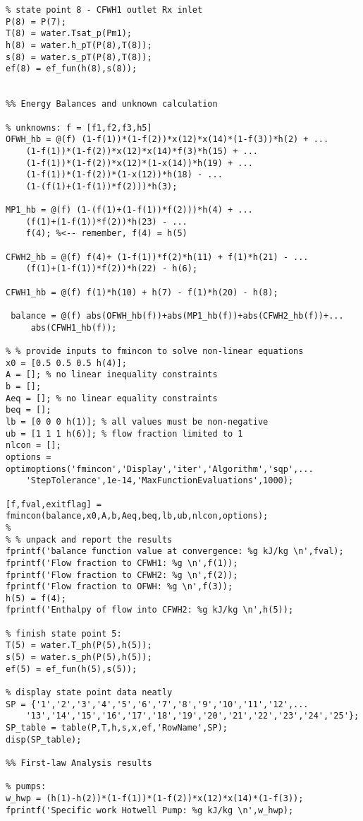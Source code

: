 \begin{fullwidth}
\begin{lstlisting}
% state point 8 - CFWH1 outlet Rx inlet
P(8) = P(7);
T(8) = water.Tsat_p(Pm1); 
h(8) = water.h_pT(P(8),T(8));
s(8) = water.s_pT(P(8),T(8));
ef(8) = ef_fun(h(8),s(8));


%% Energy Balances and unknown calculation

% unknowns: f = [f1,f2,f3,h5]
OFWH_hb = @(f) (1-f(1))*(1-f(2))*x(12)*x(14)*(1-f(3))*h(2) + ...
    (1-f(1))*(1-f(2))*x(12)*x(14)*f(3)*h(15) + ...
    (1-f(1))*(1-f(2))*x(12)*(1-x(14))*h(19) + ...
    (1-f(1))*(1-f(2))*(1-x(12))*h(18) - ...
    (1-(f(1)+(1-f(1))*f(2)))*h(3);

MP1_hb = @(f) (1-(f(1)+(1-f(1))*f(2)))*h(4) + ...
    (f(1)+(1-f(1))*f(2))*h(23) - ...
    f(4); %<-- remember, f(4) = h(5)

CFWH2_hb = @(f) f(4)+ (1-f(1))*f(2)*h(11) + f(1)*h(21) - ...
    (f(1)+(1-f(1))*f(2))*h(22) - h(6);

CFWH1_hb = @(f) f(1)*h(10) + h(7) - f(1)*h(20) - h(8);
    
 balance = @(f) abs(OFWH_hb(f))+abs(MP1_hb(f))+abs(CFWH2_hb(f))+...
     abs(CFWH1_hb(f));
 
% % provide inputs to fmincon to solve non-linear equations
x0 = [0.5 0.5 0.5 h(4)];
A = []; % no linear inequality constraints
b = [];
Aeq = []; % no linear equality constraints
beq = [];
lb = [0 0 0 h(1)]; % all values must be non-negative
ub = [1 1 1 h(6)]; % flow fraction limited to 1
nlcon = [];
options = optimoptions('fmincon','Display','iter','Algorithm','sqp',...
    'StepTolerance',1e-14,'MaxFunctionEvaluations',1000);

[f,fval,exitflag] = fmincon(balance,x0,A,b,Aeq,beq,lb,ub,nlcon,options);
% 
% % unpack and report the results
fprintf('balance function value at convergence: %g kJ/kg \n',fval);
fprintf('Flow fraction to CFWH1: %g \n',f(1));
fprintf('Flow fraction to CFWH2: %g \n',f(2));
fprintf('Flow fraction to OFWH: %g \n',f(3));
h(5) = f(4);
fprintf('Enthalpy of flow into CFWH2: %g kJ/kg \n',h(5));

% finish state point 5:
T(5) = water.T_ph(P(5),h(5));
s(5) = water.s_ph(P(5),h(5));
ef(5) = ef_fun(h(5),s(5));

% display state point data neatly
SP = {'1','2','3','4','5','6','7','8','9','10','11','12',...
    '13','14','15','16','17','18','19','20','21','22','23','24','25'};
SP_table = table(P,T,h,s,x,ef,'RowName',SP);
disp(SP_table);

%% First-law Analysis results

% pumps:
w_hwp = (h(1)-h(2))*(1-f(1))*(1-f(2))*x(12)*x(14)*(1-f(3));
fprintf('Specific work Hotwell Pump: %g kJ/kg \n',w_hwp);


\end{lstlisting}
\end{fullwidth}
